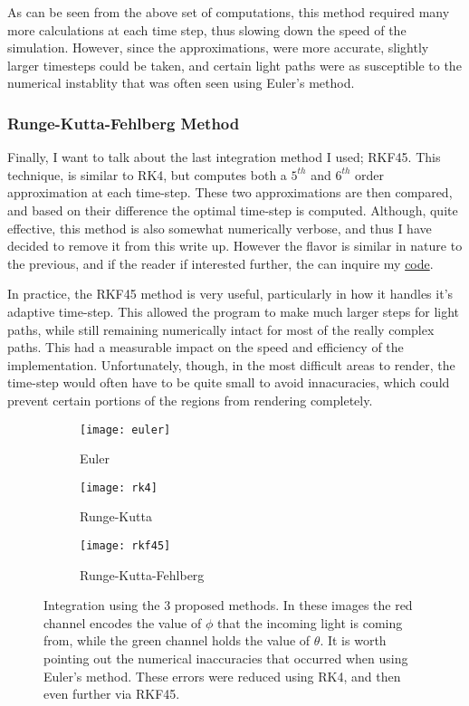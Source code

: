 \documentclass{article}
\begin{document}
As can be seen from the above set of computations, this method required many more calculations at each time step, thus slowing down the speed of the simulation. However, since the approximations, were more accurate, slightly larger timesteps could be taken, and certain light paths were as susceptible to the numerical instablity that was often seen using Euler's method.

\subsubsection{Runge-Kutta-Fehlberg Method}
Finally, I want to talk about the last integration method I used; RKF45. This technique, is similar to RK4, but computes both a $5^{th}$ and $6^{th}$ order approximation at each time-step. These two approximations are then compared, and based on their difference the optimal time-step is computed. Although, quite effective, this method is also somewhat numerically verbose, and thus I have decided to remove it from this write up. However the flavor is similar in nature to the previous, and if the reader if interested further, the can inquire my \color{red}\href{https://github.com/Varcho/GeneralRelativity}{code}\color{black}. \par
In practice, the RKF45 method is very useful, particularly in how it handles it's adaptive time-step. This allowed the program to make much larger steps for light paths, while still remaining numerically intact for most of the really complex paths. This had a measurable impact on the speed and efficiency of the implementation. Unfortunately, though, in the most difficult areas to render, the time-step would often have to be quite small to avoid innacuracies, which could prevent certain portions of the regions from rendering completely.
\begin{figure}[H]
\begin{subfigure}{.333\textwidth}
  \centering
  \texttt{[image: euler]}
  \caption{Euler}
  \label{fig:sfig1}
\end{subfigure}%
\begin{subfigure}{.333\textwidth}
  \centering
  \texttt{[image: rk4]}
  \caption{Runge-Kutta}
  \label{fig:sfig2}
\end{subfigure}%
\begin{subfigure}{.333\textwidth}
  \centering
  \texttt{[image: rkf45]}
  \caption{Runge-Kutta-Fehlberg}
  \label{fig:sfig3}
\end{subfigure}
\label{edge:vertex:face}
\caption{Integration using the 3 proposed methods. In these images the red channel encodes the value of $\phi$ that the incoming light is coming from, while the green channel holds the value of $\theta$. It is worth pointing out the numerical inaccuracies that occurred when using Euler's method. These errors were reduced using RK4, and then even further via RKF45.}
\end{figure}
\end{document}
